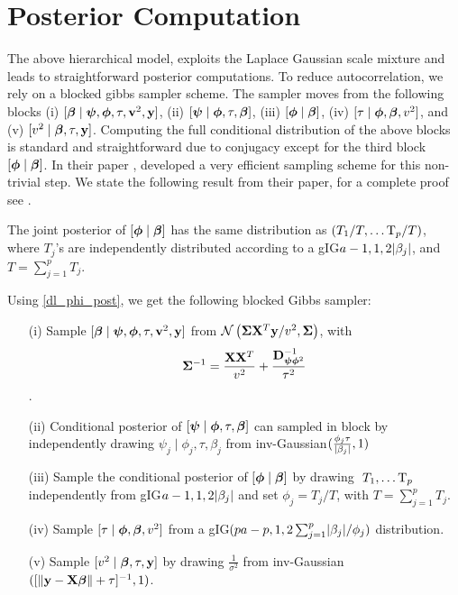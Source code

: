 \documentclass[chapters]{uamaththesis}
\begin{document}
\section{Posterior Computation}
The above hierarchical model, exploits the Laplace Gaussian scale mixture and leads to straightforward posterior computations. To reduce autocorrelation, we rely on a blocked gibbs sampler scheme. The sampler moves from the following blocks \rm{(i)} $ [ \boldsymbol{\beta} \mid \boldsymbol{\psi} , \boldsymbol{\phi} , \tau , {\bf v}^2 , {\bf y} ] $, \rm{(ii)} $[\boldsymbol{\psi} \mid \boldsymbol{\phi} , \tau , \boldsymbol{\beta}]$, \rm{(iii)}   $[ \boldsymbol{\phi} \mid \boldsymbol{\beta}]$, \rm{(iv)} $[ \tau \mid \boldsymbol{\phi}, \boldsymbol{\beta}, v^2 ]$, and \rm{(v)} $[ v^2 \mid \boldsymbol{\beta} ,\tau , {\bf y} ]  $. Computing the full conditional distribution of the above blocks is standard and straightforward due to conjugacy except for the third block $[ \boldsymbol{\phi} \mid \boldsymbol{\beta}]$. In their paper \citet{bhattacharya2014dirichlet}, developed a very efficient sampling scheme for this non-trivial step. We state the following result from their paper, for a complete proof see \citep{bhattacharya2014dirichlet}.

\begin{theorem}\label{dl_phi_post}
The joint posterior of $[\boldsymbol{\phi} \mid \boldsymbol{\beta} ]$ has the same distribution as $ \left( T_1/T, \ldots {\rm T}_p/T \right)$, where $T_j$'s are independently distributed according to a \rm{gIG}$a-1 , 1 , 2\lvert\beta_j\rvert$, and $T = \sum_{j=1}^{p}T_j$. 
\end{theorem}

Using \ref{dl_phi_post}, we get the following blocked Gibbs sampler:
\begin{itemize}
\item[(i)] Sample $[ \boldsymbol{\beta} \mid \boldsymbol{\psi} , \boldsymbol{\phi} , \tau , {\bf v}^2 , {\bf y} ]$ from $\mathcal{N} \left( \boldsymbol{\Sigma} {\bf X}^T{\bf y}/v^2 , \boldsymbol{\Sigma} \right)$, with $$ \boldsymbol{\Sigma}^{-1} = \frac{{\bf X}{\bf X}^T}{v^2} + \frac{{\bf D}^{-1}_{\boldsymbol{\psi} \boldsymbol{\phi}^2}}{\tau^2} $$.

\item[(ii)]Conditional posterior of $[\boldsymbol{\psi} \mid \boldsymbol{\phi} , \tau , \boldsymbol{\beta}]$ can sampled in block  by independently drawing $ \psi_j \mid \phi_j , \tau , \beta_j $ from \rm{inv-Gaussian}$ (\frac{\phi_j\tau}{\lvert\beta_j\rvert} ,1) $

\item[(iii)] Sample the conditional posterior of $[ \boldsymbol{\phi} \mid \boldsymbol{\beta}]$ by drawing $ \ T_1, \ldots {\rm T}_p$ independently from \rm{gIG}$a-1 , 1 , 2\lvert\beta_j\rvert$ and set $\phi_j = T_j/T$, with $T = \sum_{j=1}^{p}T_j$.

\item[(iv)] Sample $[ \tau \mid \boldsymbol{\phi}, \boldsymbol{\beta}, v^2 ]$ from a \rm{gIG}$( pa-p , 1 , 2\sum^{p}_{j=1}\lvert\beta_j\rvert/\phi_j )$ distribution.

\item[(v)] Sample $[ v^2 \mid \boldsymbol{\beta} ,\tau , {\bf y} ]  $ by drawing $ \frac{1}{\sigma^2} $ from \rm{inv-Gaussian}$ ( [ \lVert{\bf y} - {\bf X}\boldsymbol{\beta}\rVert + \tau ]^{-1} ,1) $.
\end{itemize}
\end{document}
